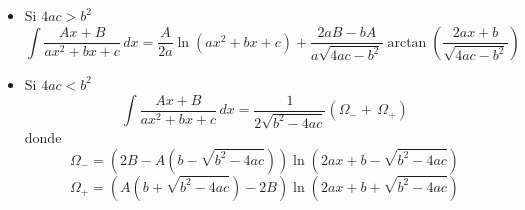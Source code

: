 \begin{itemize}
    \item Si $4ac>b^2$
    \[\int\frac{Ax+B}{ax^2+bx+c}\,dx = \frac{A}{2a}\ln{(ax^2+bx+c)}+\frac{2aB-bA}{a\sqrt{4ac-b^2}}\arctan{\left(\frac{2ax+b}{\sqrt{4ac-b^2}}\right)}\]
    \item Si $4ac<b^2$ %
    \[\int\frac{Ax+B}{ax^2+bx+c}\,dx = \frac{1}{2\sqrt{b^2-4ac}}
    \left(\Omega_{-}+\,\Omega_{+}\right)\]
    donde
    \[\Omega_{-} = (2B-A(b-\sqrt{b^2-4ac}))\ln{(2ax+b-\sqrt{b^2-4ac})}\]
    \[\Omega_{+} = (A(b+\sqrt{b^2-4ac})-2B)\ln{(2ax+b+\sqrt{b^2-4ac})}\]
\end{itemize}

\newpage